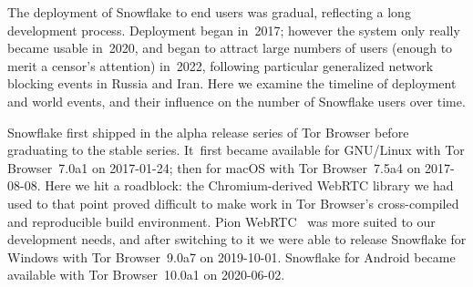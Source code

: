 \documentclass[letterpaper,twocolumn]{article}
\begin{document}
The deployment of Snowflake to end users was gradual,
reflecting a long development process.
Deployment began in~2017;
however the system only really became usable in~2020,
and began to attract large numbers of users
(enough to merit a censor's attention)
in~2022, following particular generalized
network blocking events in Russia and Iran.
Here we examine the timeline of deployment
and world events,
and their influence on the number of Snowflake users over time.

Snowflake first shipped in the alpha release series of Tor Browser
before graduating to the stable series.
It~first became available for GNU/Linux
with Tor Browser~7.0a1 on \mbox{2017-01-24};
then for macOS
with Tor Browser~7.5a4 on \mbox{2017-08-08}.
Here we hit a roadblock:
the Chromium-derived WebRTC library we had used to that point
proved difficult to make work in Tor Browser's
cross-compiled and reproducible build environment.
Pion WebRTC~\cite{pion-webrtc} was more suited to our development needs,
and after switching to it we were able to release
Snowflake for Windows
with Tor Browser~9.0a7 on \mbox{2019-10-01}.
Snowflake for Android became available with
Tor Browser~10.0a1 on \mbox{2020-06-02}.
\end{document}
